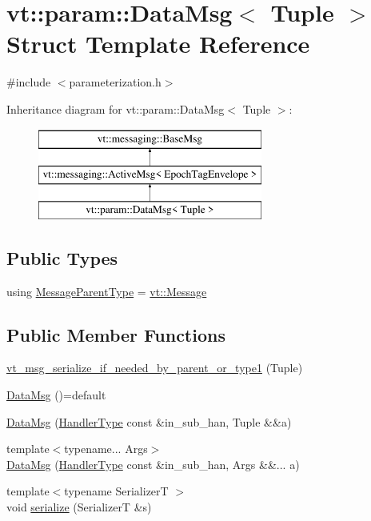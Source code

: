 \hypertarget{structvt_1_1param_1_1_data_msg}{}\section{vt\+:\+:param\+:\+:Data\+Msg$<$ Tuple $>$ Struct Template Reference}
\label{structvt_1_1param_1_1_data_msg}


{\ttfamily \#include $<$parameterization.\+h$>$}

Inheritance diagram for vt\+:\+:param\+:\+:Data\+Msg$<$ Tuple $>$\+:\begin{figure}[H]
\begin{center}
\leavevmode
\includegraphics[height=3.000000cm]{structvt_1_1param_1_1_data_msg}
\end{center}
\end{figure}
\subsection*{Public Types}
\begin{DoxyCompactItemize}
\item 
using \hyperlink{structvt_1_1param_1_1_data_msg_a6a0987fc4a53eb4fb13d9ef73106d7a2}{Message\+Parent\+Type} = \hyperlink{namespacevt_a3a3ddfef40b4c90915fa43cdd5f129ea}{vt\+::\+Message}
\end{DoxyCompactItemize}
\subsection*{Public Member Functions}
\begin{DoxyCompactItemize}
\item 
\hyperlink{structvt_1_1param_1_1_data_msg_a4ea6628cf1850981cbc76ce0d0279e9e}{vt\+\_\+msg\+\_\+serialize\+\_\+if\+\_\+needed\+\_\+by\+\_\+parent\+\_\+or\+\_\+type1} (Tuple)
\item 
\hyperlink{structvt_1_1param_1_1_data_msg_a6035a979b9ee9448fba9dd78cd976ed5}{Data\+Msg} ()=default
\item 
\hyperlink{structvt_1_1param_1_1_data_msg_a9aa000cf8ea52f4b3e281153e8e94fe8}{Data\+Msg} (\hyperlink{namespacevt_af64846b57dfcaf104da3ef6967917573}{Handler\+Type} const \&in\+\_\+sub\+\_\+han, Tuple \&\&a)
\item 
{\footnotesize template$<$typename... Args$>$ }\\\hyperlink{structvt_1_1param_1_1_data_msg_aae3d76ec2fbfda18cb8131cb41444e76}{Data\+Msg} (\hyperlink{namespacevt_af64846b57dfcaf104da3ef6967917573}{Handler\+Type} const \&in\+\_\+sub\+\_\+han, Args \&\&... a)
\item 
{\footnotesize template$<$typename SerializerT $>$ }\\void \hyperlink{structvt_1_1param_1_1_data_msg_a316dc9cfa260f9b89c8264170745a7fb}{serialize} (SerializerT \&s)
\end{DoxyCompactItemize}
